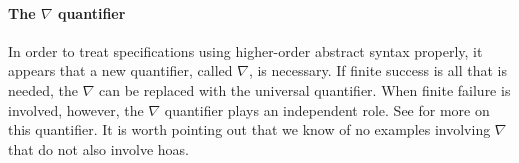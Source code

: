 \documentclass{article}
\begin{document}
\paragraph{The $\nabla$ quantifier}
In order to treat specifications using higher-order abstract syntax
properly, it appears that a new quantifier, called $\nabla$, is
necessary.  If finite success is all that is needed, the $\nabla$ can
be replaced with the universal quantifier.  When finite failure is
involved, however, the $\nabla$ quantifier plays an independent role.
See \cite{miller05tocl,tiu04phd,tiu05concur} for more on this
quantifier.  It is worth pointing out that we know of no examples
involving $\nabla$ that do not also involve hoas.


\end{document}
